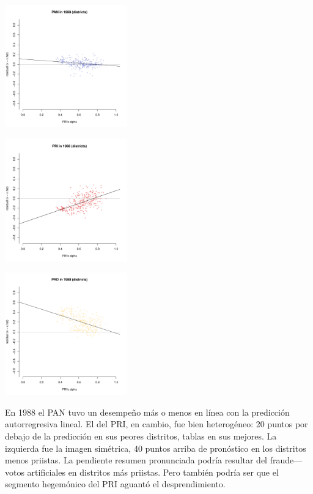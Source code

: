 \documentclass[11pt]{article}
\begin{document}
\begin{center}
\includegraphics[width=200px]{./PAN1988alphaPRI.pdf}
\end{center}
\begin{center}
\includegraphics[width=200px]{./PRI1988alphaPRI.pdf}
\end{center}
\begin{center}
\includegraphics[width=200px]{./PRD1988alphaPRI.pdf}
\end{center}

En 1988 el PAN tuvo un desempeño más o menos en línea con la predicción autorregresiva lineal. El del PRI, en cambio, fue bien heterogéneo: 20 puntos por debajo de la predicción en sus peores distritos, tablas en sus mejores. La izquierda fue la imagen simétrica, 40 puntos arriba de pronóstico en los distritos menos priistas. La pendiente resumen pronunciada podría resultar del fraude---votos artificiales en distritos más priistas. Pero también podría ser que el segmento hegemónico del PRI aguantó el desprendimiento. 
\end{document}
